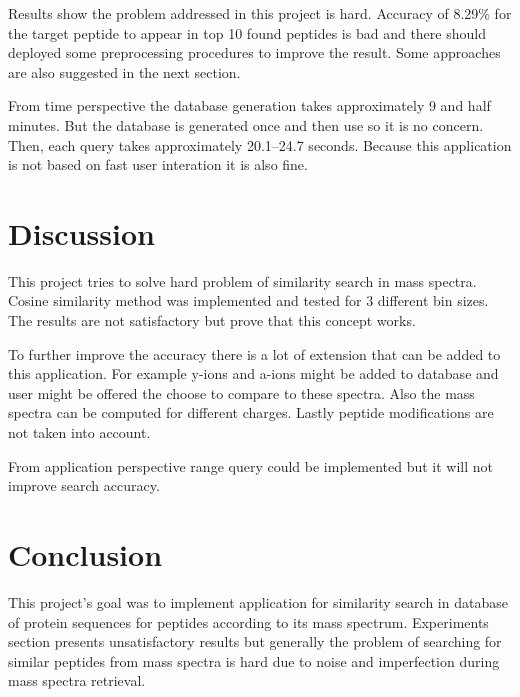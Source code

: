\documentclass[a4paper,10pt,twocolumn]{article}
\begin{document}
Results show the problem addressed in this project is hard. Accuracy of 8.29\%
for the target peptide to appear in top 10 found peptides is bad and there
should deployed some preprocessing procedures to improve the result.
Some approaches are also suggested in the next section.

From time perspective the database generation takes approximately 9 and half
minutes. But the database is generated once and then use so it is no concern.
Then, each query takes approximately 20.1--24.7 seconds. Because this application
is not based on fast user interation it is also fine.

\section{Discussion}

This project tries to solve hard problem of similarity search in mass spectra.
Cosine similarity method was implemented and tested for 3 different bin sizes.
The results are not satisfactory but prove that this concept works.

To further improve the accuracy there is a lot of extension that can be added to
this application. For example y-ions and a-ions might be added to database
and user might be offered the choose to compare to these spectra. Also the mass
spectra can be computed for different charges. Lastly peptide modifications are
not taken into account.

From application perspective range query could be implemented but it will not
improve search accuracy.

\section{Conclusion}

This project's goal was to implement application for similarity search in
database of protein sequences for peptides according to its mass spectrum.
Experiments section presents unsatisfactory results but generally the problem
of searching for similar peptides from mass spectra is hard due to noise and
imperfection during mass spectra retrieval.

{}

\end{document}
